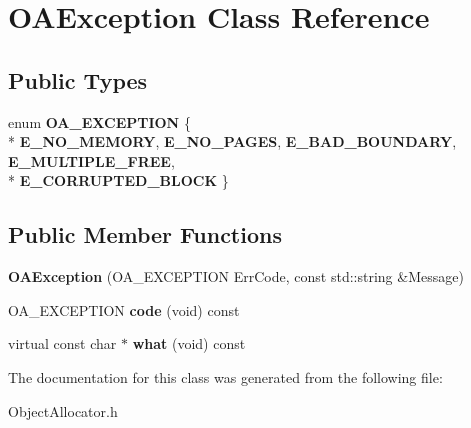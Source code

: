 \hypertarget{classOAException}{\section{O\-A\-Exception Class Reference}
\label{classOAException}
}
\subsection*{Public Types}
\begin{DoxyCompactItemize}
\item 
enum {\bfseries O\-A\-\_\-\-E\-X\-C\-E\-P\-T\-I\-O\-N} \{ \\*
{\bfseries E\-\_\-\-N\-O\-\_\-\-M\-E\-M\-O\-R\-Y}, 
{\bfseries E\-\_\-\-N\-O\-\_\-\-P\-A\-G\-E\-S}, 
{\bfseries E\-\_\-\-B\-A\-D\-\_\-\-B\-O\-U\-N\-D\-A\-R\-Y}, 
{\bfseries E\-\_\-\-M\-U\-L\-T\-I\-P\-L\-E\-\_\-\-F\-R\-E\-E}, 
\\*
{\bfseries E\-\_\-\-C\-O\-R\-R\-U\-P\-T\-E\-D\-\_\-\-B\-L\-O\-C\-K}
 \}
\end{DoxyCompactItemize}
\subsection*{Public Member Functions}
\begin{DoxyCompactItemize}
\item 
\hypertarget{classOAException_a80250ef41d10e8f7e73b9601ca3cdf3d}{{\bfseries O\-A\-Exception} (O\-A\-\_\-\-E\-X\-C\-E\-P\-T\-I\-O\-N Err\-Code, const std\-::string \&Message)}\label{classOAException_a80250ef41d10e8f7e73b9601ca3cdf3d}

\item 
\hypertarget{classOAException_ad54a0c8dd1deff601e6350e99170febe}{O\-A\-\_\-\-E\-X\-C\-E\-P\-T\-I\-O\-N {\bfseries code} (void) const }\label{classOAException_ad54a0c8dd1deff601e6350e99170febe}

\item 
\hypertarget{classOAException_a599ea1b52cdbd3c2838828ea3a2468ef}{virtual const char $\ast$ {\bfseries what} (void) const }\label{classOAException_a599ea1b52cdbd3c2838828ea3a2468ef}

\end{DoxyCompactItemize}


The documentation for this class was generated from the following file\-:\begin{DoxyCompactItemize}
\item 
Object\-Allocator.\-h\end{DoxyCompactItemize}
